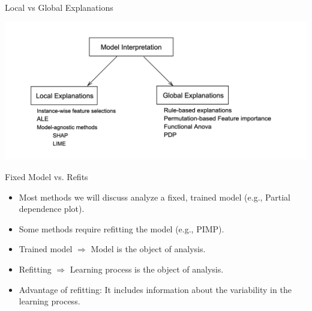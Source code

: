 \documentclass[11pt,compress,t,notes=noshow, aspectratio=169, xcolor=table]{beamer}
\begin{document}
\begin{frame}{Local vs Global Explanations}
	\begin{center}
		\includegraphics[width=\textwidth]{figure/1-local-global.png}
	\end{center}
\end{frame}


\begin{frame}{Fixed Model vs. Refits}
	\begin{itemize}
		\itemsep1em
		\item Most methods we will discuss analyze a fixed, trained model (e.g., Partial dependence plot).
		\item Some methods require refitting the model (e.g., PIMP).
		\item Trained model $\Rightarrow$ Model is the object of analysis.
		\item Refitting $\Rightarrow$ Learning process is the object of analysis.
		\item Advantage of refitting: It includes information about the variability in the learning process.
	\end{itemize}
\end{frame}
\end{document}
